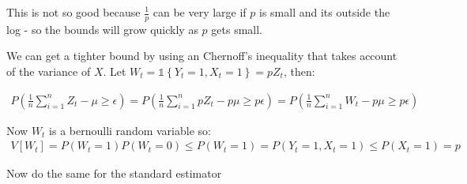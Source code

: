 \documentclass{article}
\newcommand{\set}[1]{\left\{#1\right\}}
\newcommand{\ind}[1]{\mathds{1}\!\!\set{#1}}
\newcommand{\eqn}[1]{\begin{align}#1\end{align}}
\theoremstyle{plain}
\theoremstyle{definition}
\begin{document}
This is not so good because $\frac{1}{p}$ can be very large if $p$ is small and its outside the log - so the bounds will grow quickly as $p$ gets small. 

We can get a tighter bound by using an Chernoff's inequality that takes account of the variance of $X$. Let $W_t = \ind{Y_t = 1,X_t=1} = pZ_t$, then:

\eqn{
P(\frac{1}{n}\sum_{i=1}^n Z_t - \mu \geq \epsilon) = P(\frac{1}{n}\sum_{i=1}^n pZ_t - p\mu \geq p\epsilon) = P(\frac{1}{n}\sum_{i=1}^n W_t - p\mu \geq p\epsilon)
}

Now $W_t$ is a bernoulli random variable so:
\eqn{
V[W_t] = P(W_t=1)P(W_t=0) \leq P(W_t=1) = P(Y_t=1,X_t=1) \leq P(X_t=1) = p
}



\color{red} Now do the same for the standard estimator \color{black}








\end{document}
